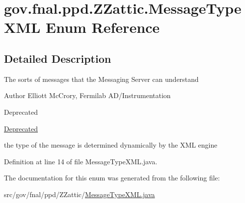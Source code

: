 \hypertarget{enumgov_1_1fnal_1_1ppd_1_1ZZattic_1_1MessageTypeXML}{\section{gov.\-fnal.\-ppd.\-Z\-Zattic.\-Message\-Type\-X\-M\-L Enum Reference}
\label{enumgov_1_1fnal_1_1ppd_1_1ZZattic_1_1MessageTypeXML}
}


\subsection{Detailed Description}
The sorts of messages that the Messaging Server can understand

\begin{DoxyAuthor}{Author}
Elliott Mc\-Crory, Fermilab A\-D/\-Instrumentation 
\end{DoxyAuthor}
\begin{DoxyRefDesc}{Deprecated}
\item[\hyperlink{deprecated__deprecated000020}{Deprecated}]
\begin{DoxyItemize}
\item the type of the message is determined dynamically by the X\-M\-L engine 
\end{DoxyItemize}\end{DoxyRefDesc}


Definition at line 14 of file Message\-Type\-X\-M\-L.\-java.



The documentation for this enum was generated from the following file\-:\begin{DoxyCompactItemize}
\item 
src/gov/fnal/ppd/\-Z\-Zattic/\hyperlink{MessageTypeXML_8java}{Message\-Type\-X\-M\-L.\-java}\end{DoxyCompactItemize}
